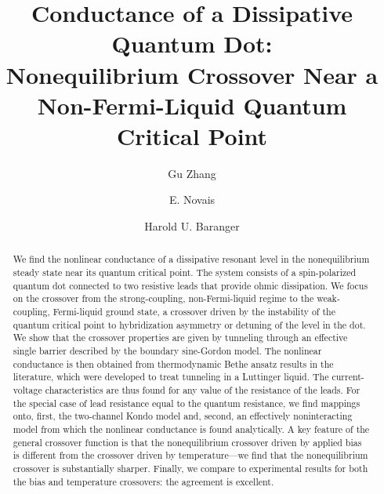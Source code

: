 \documentclass[aps,prb,reprint,floatfix,superscriptaddress,amssymb,amsmath]{revtex4-2}
\begin{document}
\title{Conductance of a Dissipative Quantum Dot:\\Nonequilibrium Crossover Near a Non-Fermi-Liquid Quantum Critical Point}


\author{Gu Zhang}

\author{E. Novais}

\author{Harold U. Baranger}

\begin{abstract}
We find the nonlinear conductance of a dissipative resonant level in the nonequilibrium steady state near its quantum critical point. The system consists of a spin-polarized quantum dot connected to two resistive leads that provide ohmic dissipation. We focus on the crossover from the strong-coupling, non-Fermi-liquid regime to the weak-coupling, Fermi-liquid ground state, a crossover driven by the instability of the quantum critical point to hybridization asymmetry or detuning of the level in the dot. We show that the crossover properties are given by tunneling through an effective single barrier described by the boundary sine-Gordon model. The nonlinear conductance is then obtained from thermodynamic Bethe ansatz results in the literature, which were developed to treat tunneling in a Luttinger liquid. The current-voltage characteristics are thus found for any value of the resistance of the leads. For the special case of lead resistance equal to the quantum resistance, we find mappings onto, first, the two-channel Kondo model and, second, an effectively noninteracting model from which the nonlinear conductance is found analytically. A key feature of the general crossover function is that the nonequilibrium crossover driven by applied bias is different from the crossover driven by temperature---we find that the nonequilibrium crossover is substantially sharper. Finally, we compare to experimental results for both the bias and temperature crossovers: the agreement is excellent.
\end{abstract}
\end{document}
